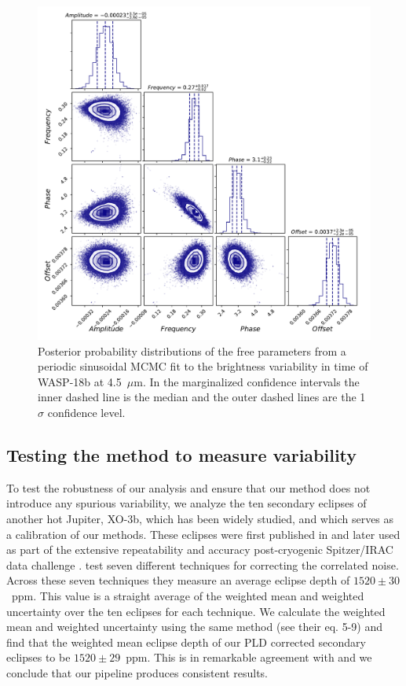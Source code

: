 \begin{figure}
    \centering
    \includegraphics[width=\linewidth]{MCMCcorner.pdf}
    \caption{Posterior probability distributions of the free parameters from a periodic sinusoidal MCMC fit to the brightness variability in time of WASP-18b at 4.5~$\mu$m. In the marginalized confidence intervals the inner dashed line is the median and the outer dashed lines are the 1$\sigma$ confidence level. }
    \label{P3:fig:MCMCcorner}
\end{figure}

\subsection{Testing the method to measure variability}

To test the robustness of our analysis and ensure that our method does not introduce any spurious variability, we analyze the ten secondary eclipses of another hot Jupiter, XO-3b, which has been widely studied, and which serves as a calibration of our methods. These eclipses were first published in \citet{Wong2014} and later used as part of the extensive repeatability and accuracy post-cryogenic Spitzer/IRAC data challenge \citep{Ingalls2016}. \citet{Ingalls2016} test seven different techniques for correcting the correlated noise. Across these seven techniques they measure an average eclipse depth of $1520 \pm 30$~ppm. This value is a straight average of the weighted mean and weighted uncertainty over the ten eclipses for each technique. We calculate the weighted mean and weighted uncertainty using the same method (see their eq. 5-9) and find that the weighted mean eclipse depth of our PLD corrected secondary eclipses to be $1520 \pm 29$~ppm. This is in remarkable agreement with \citet{Ingalls2016} and we conclude that our pipeline produces consistent results.


